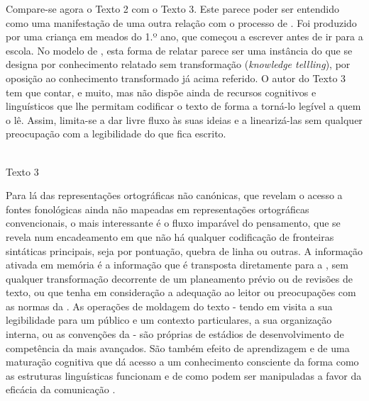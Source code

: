 \documentclass[output=paper]{LSP/langsci}
\begin{document}
Compare-se agora o Texto 2 com o Texto 3. Este parece poder ser entendido como uma manifestação de uma outra relação com o processo de . Foi produzido por uma criança em meados do 1.º ano, que começou a escrever antes de ir para a escola. No modelo de \cite{scardamaliabereiter1987}, esta forma de relatar parece ser uma instância do que se designa por conhecimento relatado sem transformação (\textit{knowledge tellling}), por oposição ao conhecimento transformado já acima referido. O autor do Texto 3 tem que contar, e muito, mas não dispõe ainda de recursos cognitivos e linguísticos que lhe permitam codificar o texto de forma a torná-lo legível a quem o lê. Assim, limita-se a dar livre fluxo às suas ideias e a linearizá-las sem qualquer preocupação com a legibilidade do que fica escrito.

\begin{center}
\\\vspace{1em}Texto 3
\end{center}

Para lá das representações ortográficas não canónicas, que revelam o acesso a fontes fonológicas ainda não mapeadas em representações ortográficas convencionais, o mais interessante é o fluxo imparável do pensamento, que se revela num encadeamento em que não há qualquer codificação de fronteiras sintáticas principais, seja por pontuação, quebra de linha ou outras. A informação ativada em memória é a informação que é transposta diretamente para a , sem qualquer transformação decorrente de um planeamento prévio ou de revisões de texto, ou que tenha em consideração a adequação ao leitor ou preocupações com as normas da . As operações de moldagem do texto - tendo em visita a sua legibilidade para um público e um contexto particulares, a sua organização interna, ou as convenções da  - são próprias de estádios de desenvolvimento de competência da  mais avançados. São também efeito de aprendizagem e de uma maturação cognitiva que dá acesso a um conhecimento consciente da forma como as estruturas linguísticas funcionam e de como podem ser manipuladas a favor da eficácia da comunicação . 
\end{document}
